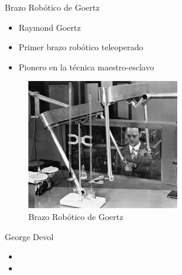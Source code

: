 

\begin{frame}[fragile]{Brazo Robótico de Goertz}
\vspace{8px}
\pause
{}
\begin{block}{}
	\begin{itemize}
		\item Raymond Goertz
		\pause
		\item Primer brazo robótico teleoperado
		\pause
		\item Pionero en la técnica maestro-esclavo
	\end{itemize}
\end{block}
\begin{figure}
		\centering
		\includegraphics[scale=3.5]{./EtapaPrimeriza/imagenes/brazo.jpg}
		\caption{Brazo Robótico de Goertz}
\end{figure}
\end{frame}




\begin{frame}[fragile]{ George Devol          }
\vspace{8px}
\pause
{}
\begin{block}{}
	\begin{itemize}
		\item 
		\pause
		\item 
	\end{itemize}
\end{block}
\end{frame}


